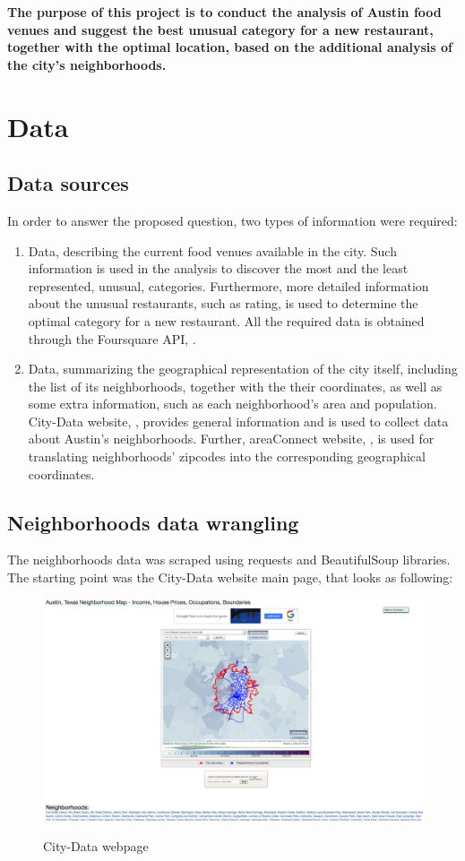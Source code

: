 \documentclass[11pt]{article}
\numberwithin{equation}{section}
\begin{document}
{\bf The purpose of this project is to conduct the analysis of Austin food venues and suggest the best unusual category for a new restaurant, together with the optimal location, based on the additional analysis of the city's neighborhoods. }

\section{Data}
%
\subsection{Data sources}
In order to answer the proposed question, two types of information were required: 
\begin{enumerate}
\item Data, describing the current food venues available in the city. Such information is used in the analysis to discover the most and the least represented, unusual, categories. Furthermore, more detailed information about the unusual restaurants, such as rating, is used to determine the optimal category for a new restaurant. All the required data is obtained through the Foursquare API, \cite{foursquare}.
\item Data, summarizing the geographical representation of the city itself, including the list of its neighborhoods, together with the their coordinates, as well as some extra information, such as each neighborhood's area and population. City-Data website, \cite{city_data}, provides general information and is used to collect data about Austin's neighborhoods.  Further, areaConnect website,  \cite{area_connect}, is used for translating neighborhoods' zipcodes into the corresponding geographical coordinates.
\end{enumerate}
%
\subsection{Neighborhoods data wrangling}
The neighborhoods data was scraped using requests and BeautifulSoup libraries. The starting point was the City-Data website main page, that looks as following:
\begin{figure}[h!]
	\centering
	\includegraphics[width=.8\textwidth]{pics/city_data_start}
		\label{fig:1_1}
	\caption{City-Data webpage}
	\label{fig:4}
\end{figure}
\end{document}
